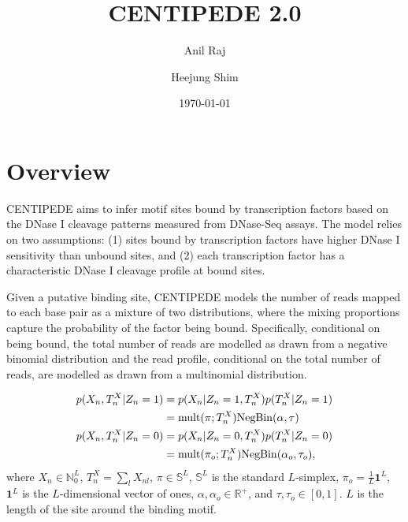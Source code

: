 \documentclass[reqno]{amsart}
\numberwithin{equation}{section}
\begin{document}
\title{CENTIPEDE 2.0}

\author{Anil Raj}
\author{Heejung Shim}

\date{\today}

\maketitle

\section{Overview}
CENTIPEDE aims to infer motif sites bound by transcription factors based on the DNase I cleavage patterns
measured from DNase-Seq assays. The model relies on two assumptions: (1) sites bound by transcription
factors have higher DNase I sensitivity than unbound sites, and (2) each transcription factor has a 
characteristic DNase I cleavage profile at bound sites.

Given a putative binding site, CENTIPEDE models the number of reads mapped to each base pair as a mixture
of two distributions, where the mixing proportions capture the probability of the factor being bound.
Specifically, conditional on being bound, the total number of reads are modelled as drawn from a 
negative binomial distribution and the read profile, conditional on the total number of reads, are 
modelled as drawn from a multinomial distribution.

\begin{align}
    p(X_n, T^X_n | Z_n=1) 
        & = p(X_n | Z_n=1, T^X_n) p(T^X_n | Z_n=1) \\
        & = \mathrm{mult}(\pi; T^X_n) \mathrm{NegBin}(\alpha, \tau) \\
    p(X_n, T^X_n | Z_n=0)
        & = p(X_n | Z_n=0, T^X_n) p(T^X_n | Z_n=0) \\
        & = \mathrm{mult}(\pi_o; T^X_n) \mathrm{NegBin}(\alpha_o, \tau_o),
\end{align}
where $X_n \in \mathbb{N}_0^L$, $T^X_n = \sum_l X_{nl}$, $\pi \in \mathbb{S}^L$, $\mathbb{S}^L$ is the standard $L$-simplex, $\pi_o = \frac{1}{L}\mathbf{1}^L$, $\mathbf{1}^L$ is the $L$-dimensional vector of ones, $\alpha, \alpha_o \in \mathbb{R}^+$, and $\tau, \tau_o \in [0,1]$. $L$ is the length of the site around the binding motif.
\end{document}
